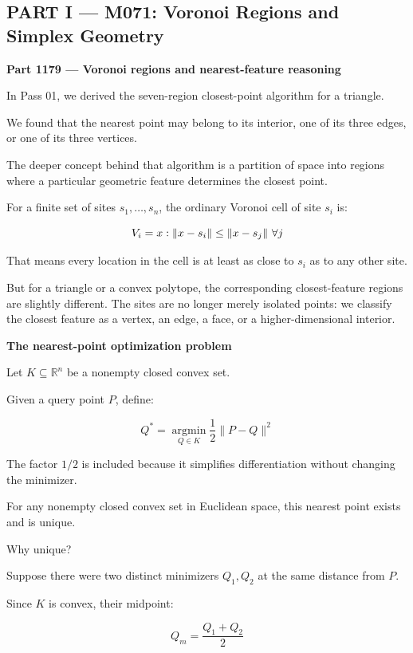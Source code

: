 \subsection{PART I --- M071: Voronoi Regions and Simplex Geometry}\label{04-visual-computing-ii-ch022-part-i-m071-voronoi-regions-and-simplex-geometry}

\textbf{Part 1179 --- Voronoi regions and nearest-feature reasoning}

In Pass 01, we derived the seven-region closest-point algorithm for a triangle.

We found that the nearest point may belong to its interior, one of its three edges, or one of its three vertices.

The deeper concept behind that algorithm is a partition of space into regions where a particular geometric feature determines the closest point.

For a finite set of sites \(s_1,\ldots,s_n\), the ordinary Voronoi cell of site \(s_i\) is:

\[
V_i=\\{x:\|x-s_i\|\le\|x-s_j\|\ \forall j\\}
\]

That means every location in the cell is at least as close to \(s_i\) as to any other site.

But for a triangle or a convex polytope, the corresponding closest-feature regions are slightly different. The sites are no longer merely isolated points: we classify the closest feature as a vertex, an edge, a face, or a higher-dimensional interior.

\textbf{The nearest-point optimization problem}

Let \(K\subseteq\mathbb R^n\) be a nonempty closed convex set.

Given a query point \(P\), define:

\[
\boxed{ Q^*=\underset{Q\in K}{\operatorname{argmin}}\frac12\|P-Q\|^2 }
\]

The factor \(1/2\) is included because it simplifies differentiation without changing the minimizer.

For any nonempty closed convex set in Euclidean space, this nearest point exists and is unique.

Why unique?

Suppose there were two distinct minimizers \(Q_1,Q_2\) at the same distance from \(P\).

Since \(K\) is convex, their midpoint:

\[
Q_m=\frac{Q_1+Q_2}{2}
\]

